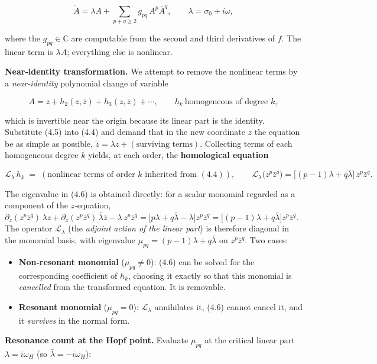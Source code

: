 \documentclass[
  11pt,
]{article}
\providecommand{\tightlist}{%
  \setlength{\itemsep}{0pt}\setlength{\parskip}{0pt}}
\begin{document}
\[
\dot A=\lambda A+\sum_{p+q\ge 2} g_{pq}\,A^{p}\bar A^{q},
\qquad \lambda=\sigma_0+i\omega,
\tag{4.4}
\]

where the \(g_{pq}\in\mathbb{C}\) are computable from the second and
third derivatives of \(f\). The linear term is \(\lambda A\); everything
else is nonlinear.

\textbf{Near‑identity transformation.} We attempt to remove the
nonlinear terms by a \emph{near‑identity} polynomial change of variable

\[
A=z+h_2(z,\bar z)+h_3(z,\bar z)+\cdots,
\qquad h_k \ \text{homogeneous of degree } k,
\tag{4.5}
\]

which is invertible near the origin because its linear part is the
identity. Substitute (4.5) into (4.4) and demand that in the new
coordinate \(z\) the equation be as simple as possible,
\(\dot z=\lambda z+(\text{surviving terms})\). Collecting terms of each
homogeneous degree \(k\) yields, at each order, the \textbf{homological
equation}

\[
\mathcal L_\lambda\, h_k \;=\; (\text{nonlinear terms of order }k\text{ inherited from }(4.4)),
\qquad
\mathcal L_\lambda\big(z^{p}\bar z^{q}\big)=\big[(p-1)\lambda+q\bar\lambda\big]\,z^{p}\bar z^{q}.
\tag{4.6}
\]

The eigenvalue in (4.6) is obtained directly: for a scalar monomial
regarded as a component of the \(z\)‑equation,
\(\partial_z(z^p\bar z^q)\,\lambda z+\partial_{\bar z}(z^p\bar z^q)\,\bar\lambda\bar z-\lambda\,z^p\bar z^q
=\big[p\lambda+q\bar\lambda-\lambda\big]z^p\bar z^q=\big[(p-1)\lambda+q\bar\lambda\big]z^p\bar z^q\).
The operator \(\mathcal L_\lambda\) (the \emph{adjoint action of the
linear part}) is therefore diagonal in the monomial basis, with
eigenvalue \(\mu_{pq}=(p-1)\lambda+q\bar\lambda\) on \(z^p\bar z^q\).
Two cases:

\begin{itemize}
\tightlist
\item
  \textbf{Non‑resonant monomial} (\(\mu_{pq}\neq 0\)): (4.6) can be
  solved for the corresponding coefficient of \(h_k\), choosing it
  exactly so that this monomial is \emph{cancelled} from the transformed
  equation. It is removable.
\item
  \textbf{Resonant monomial} (\(\mu_{pq}=0\)): \(\mathcal L_\lambda\)
  annihilates it, (4.6) cannot cancel it, and it \emph{survives} in the
  normal form.
\end{itemize}

\textbf{Resonance count at the Hopf point.} Evaluate \(\mu_{pq}\) at the
critical linear part \(\lambda=i\omega_H\) (so
\(\bar\lambda=-i\omega_H\)):
\end{document}
